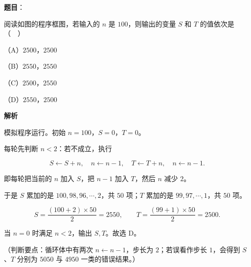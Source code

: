 \begin{answer}

\textbf{题目}：

阅读如图的程序框图，若输入的 $n$ 是 $100$，则输出的变量 $S$ 和 $T$ 的值依次是（　）
\nopagebreak[4]
\begin{center}\end{center}
\nopagebreak[4]
（A）$2500$，$2500$

（B）$2550$，$2550$

（C）$2500$，$2550$

（D）$2550$，$2500$

\textbf{解析}

模拟程序运行。初始 $n=100$，$S=0$，$T=0$。

每轮先判断 $n<2$：若不成立，执行

\nopagebreak[4]
\[S\leftarrow S+n,\quad n\leftarrow n-1,\quad T\leftarrow T+n,\quad n\leftarrow n-1.\]

即每轮把当前的 $n$ 加入 $S$，把 $n-1$ 加入 $T$，然后 $n$ 减少 $2$。

于是 $S$ 累加的是 $100,98,96,\cdots,2$，共 $50$ 项；$T$ 累加的是 $99,97,\cdots,1$，共 $50$ 项。

\nopagebreak[4]
\[S=\frac{(100+2)\times50}{2}=2550,\qquad T=\frac{(99+1)\times50}{2}=2500.\]

当 $n=0$ 时满足 $n<2$，输出 $S,T$。故选 D。

（判断要点：循环体中有两次 $n\leftarrow n-1$，步长为 $2$；若误看作步长 $1$，会得到 $S$、$T$ 分别为 $5050$ 与 $4950$ 一类的错误结果。）


\end{answer}
